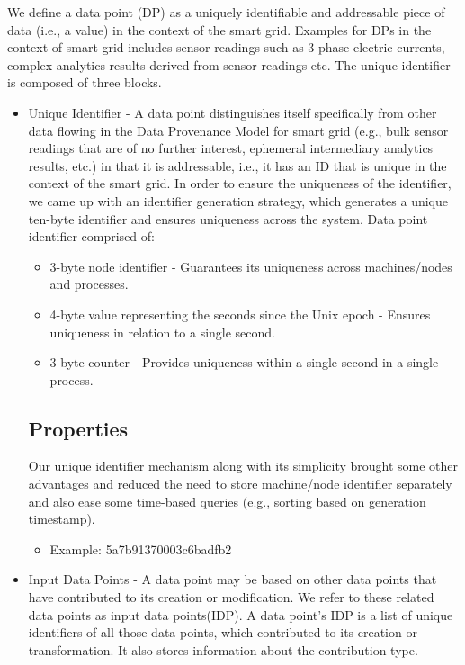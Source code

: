 We define a data point (DP) as a uniquely identifiable and addressable piece of data (i.e., a value) in the context of the smart grid. Examples for DPs in the context of smart grid includes sensor readings such as 3-phase electric currents, complex analytics results derived from sensor readings etc. The unique identifier is composed of three blocks.
\begin{itemize}
	\item Unique Identifier - A data point distinguishes itself specifically from other data flowing in the Data Provenance Model for smart grid  (e.g., bulk sensor readings that are of no further interest, ephemeral intermediary analytics results, etc.) in that it is addressable, i.e., it has an ID that is unique in the context of the smart grid. In order to ensure the uniqueness of the identifier, we came up with an identifier generation strategy, which generates a unique ten-byte identifier and ensures uniqueness across the system. Data point identifier comprised of:
		\begin{itemize}
			\item 3-byte node identifier - Guarantees its uniqueness across machines/nodes and processes.
			\item 4-byte value representing the seconds since the Unix epoch - Ensures uniqueness in relation to a single second.
			\item 3-byte counter - Provides uniqueness within a single second in a single process.
		\end{itemize}
		\subsection* {Properties} Our unique identifier mechanism along with its simplicity brought some other advantages and reduced the need to store machine/node identifier separately and also ease some time-based queries (e.g., sorting based on generation timestamp).
			\begin{itemize}				
				\item Example: 5a7b91370003c6badfb2
			\end{itemize}
	\item Input Data Points - A data point may be based on other data points that have contributed to its creation or modification. We refer to these related
data points as input data points(IDP). A data point's IDP is a list of unique identifiers of all those data points, which contributed to its creation or transformation. It also stores information about the contribution type.
	

\end{itemize}

